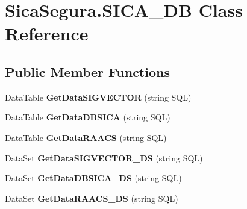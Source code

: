 \hypertarget{class_sica_segura_1_1_s_i_c_a___d_b}{}\section{Sica\+Segura.\+S\+I\+C\+A\+\_\+\+DB Class Reference}
\label{class_sica_segura_1_1_s_i_c_a___d_b}
\subsection*{Public Member Functions}
\begin{DoxyCompactItemize}
\item 
Data\+Table {\bfseries Get\+Data\+S\+I\+G\+V\+E\+C\+T\+OR} (string S\+QL)\hypertarget{class_sica_segura_1_1_s_i_c_a___d_b_a69dd766036eaae4e708f5ba94e4f29a0}{}\label{class_sica_segura_1_1_s_i_c_a___d_b_a69dd766036eaae4e708f5ba94e4f29a0}

\item 
Data\+Table {\bfseries Get\+Data\+D\+B\+S\+I\+CA} (string S\+QL)\hypertarget{class_sica_segura_1_1_s_i_c_a___d_b_a714e268e1ecca8f60d37c8814bf87c68}{}\label{class_sica_segura_1_1_s_i_c_a___d_b_a714e268e1ecca8f60d37c8814bf87c68}

\item 
Data\+Table {\bfseries Get\+Data\+R\+A\+A\+CS} (string S\+QL)\hypertarget{class_sica_segura_1_1_s_i_c_a___d_b_a6160cb159048c1eb1771900be646faaa}{}\label{class_sica_segura_1_1_s_i_c_a___d_b_a6160cb159048c1eb1771900be646faaa}

\item 
Data\+Set {\bfseries Get\+Data\+S\+I\+G\+V\+E\+C\+T\+O\+R\+\_\+\+DS} (string S\+QL)\hypertarget{class_sica_segura_1_1_s_i_c_a___d_b_af4276e1fdd34e5756b1af0e0284b337b}{}\label{class_sica_segura_1_1_s_i_c_a___d_b_af4276e1fdd34e5756b1af0e0284b337b}

\item 
Data\+Set {\bfseries Get\+Data\+D\+B\+S\+I\+C\+A\+\_\+\+DS} (string S\+QL)\hypertarget{class_sica_segura_1_1_s_i_c_a___d_b_a578bd73974c02cf892e4d731ca0a897f}{}\label{class_sica_segura_1_1_s_i_c_a___d_b_a578bd73974c02cf892e4d731ca0a897f}

\item 
Data\+Set {\bfseries Get\+Data\+R\+A\+A\+C\+S\+\_\+\+DS} (string S\+QL)\hypertarget{class_sica_segura_1_1_s_i_c_a___d_b_affec844b77e7b23d5bf3ec597e3c4f68}{}\label{class_sica_segura_1_1_s_i_c_a___d_b_affec844b77e7b23d5bf3ec597e3c4f68}

\end{DoxyCompactItemize}
